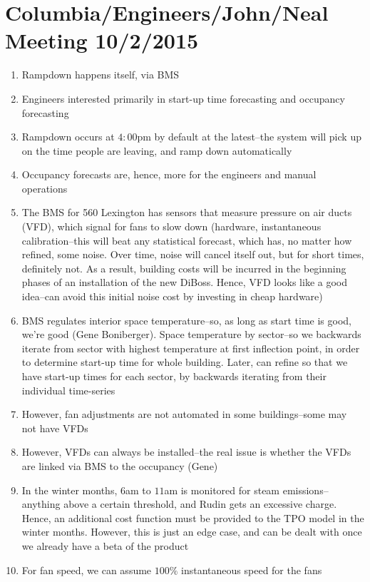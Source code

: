 \documentclass[12pt,a4paper]{article}
\begin{document}
\section{Columbia/Engineers/John/Neal Meeting 10/2/2015}
\begin{enumerate}
	\item Rampdown happens itself, via BMS
	\item Engineers interested primarily in start-up time forecasting and
		occupancy forecasting
	\item Rampdown occurs at $4:00$pm by default at the latest--the system will
		pick up on the time people are leaving, and ramp down automatically
	\item Occupancy forecasts are, hence, more for the engineers and manual
		operations
	\item The BMS for 560 Lexington has sensors that measure pressure on air
		ducts (VFD), which signal for fans to slow down (hardware, instantaneous
		calibration--this will beat any statistical forecast, which has, no matter
		how refined, some noise. Over time, noise will cancel itself out, but for
		short times, definitely not. As a result, building costs will be incurred
		in the beginning phases of an installation of the new DiBoss. Hence, VFD
		looks like a good idea--can avoid this initial noise cost by investing in
		cheap hardware)
	\item BMS regulates interior space temperature--so, as long as start time
		is good, we're good (Gene Boniberger). Space temperature by sector--so we
		backwards iterate from sector with highest temperature at first inflection
		point, in order to determine start-up time for whole building. Later, can
		refine so that we have start-up times for each sector, by backwards
		iterating from their individual time-series
	\item However, fan adjustments are not automated in some buildings--some
		may not have VFDs
	\item However, VFDs can always be installed--the real issue is whether
		the VFDs are linked via BMS to the occupancy (Gene)
	\item In the winter months, $6$am to $11$am is monitored for steam
		emissions--anything above a certain threshold, and Rudin gets an excessive
		charge. Hence, an additional cost function must be provided to the TPO
		model in the winter months. However, this is just an edge case, and can be
		dealt with once we already have a beta of the product
	\item For fan speed, we can assume $100\%$ instantaneous speed for the fans

\end{enumerate}
\end{document}
